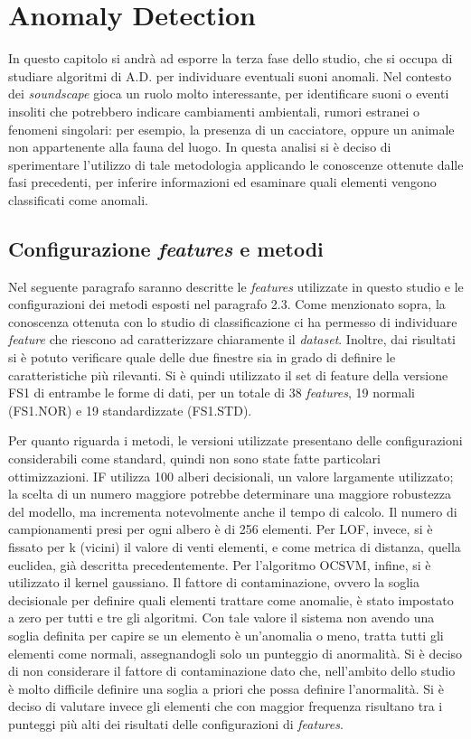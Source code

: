 \chapter{Anomaly Detection}
In questo capitolo si andrà ad esporre la terza fase dello studio, che si occupa di studiare
algoritmi di A.D. per individuare eventuali suoni anomali. Nel contesto dei \textit{soundscape} gioca
un ruolo molto interessante, per identificare suoni o eventi insoliti che potrebbero indicare
cambiamenti ambientali, rumori estranei o fenomeni singolari: per esempio, la presenza di un
cacciatore, oppure un animale non appartenente alla fauna del luogo. In questa analisi si è
deciso di sperimentare l’utilizzo di tale metodologia applicando le conoscenze ottenute dalle
fasi precedenti, per inferire informazioni ed esaminare quali elementi vengono classificati
come anomali.

\section{Configurazione \textit{features} e metodi}
Nel seguente paragrafo saranno descritte le \textit{features} utilizzate in questo studio e le
configurazioni dei metodi esposti nel paragrafo 2.3. Come menzionato sopra, la conoscenza
ottenuta con lo studio di classificazione ci ha permesso di individuare \textit{feature} che riescono ad
caratterizzare chiaramente il \textit{dataset}. Inoltre, dai risultati si è potuto verificare quale delle due
finestre sia in grado di definire le caratteristiche più rilevanti. Si è quindi utilizzato il set di
feature della versione FS1 di entrambe le forme di dati, per un totale di 38 \textit{features}, 19
normali (FS1.NOR) e 19 standardizzate (FS1.STD).

Per quanto riguarda i metodi, le versioni utilizzate presentano delle configurazioni
considerabili come standard, quindi non sono state fatte particolari ottimizzazioni. IF utilizza
100 alberi decisionali, un valore largamente utilizzato; la scelta di un numero maggiore
potrebbe determinare una maggiore robustezza del modello, ma incrementa notevolmente
anche il tempo di calcolo. Il numero di campionamenti presi per ogni albero è di 256
elementi. Per LOF, invece, si è fissato per k (vicini) il valore di venti elementi, e come
metrica di distanza, quella euclidea, già descritta precedentemente. Per l’algoritmo OCSVM,
infine, si è utilizzato il kernel gaussiano. Il fattore di contaminazione, ovvero la soglia
decisionale per definire quali elementi trattare come anomalie, è stato impostato a zero per
tutti e tre gli algoritmi. Con tale valore il sistema non avendo una soglia definita per capire se
un elemento è un'anomalia o meno, tratta tutti gli elementi come normali, assegnandogli solo
un punteggio di anormalità. Si è deciso di non considerare il fattore di contaminazione dato
che, nell’ambito dello studio è molto difficile definire una soglia a priori che possa definire l'anormalità. 
Si è deciso di valutare invece gli elementi che con maggior frequenza risultano tra i punteggi più alti dei risultati delle
configurazioni di \textit{features}.


